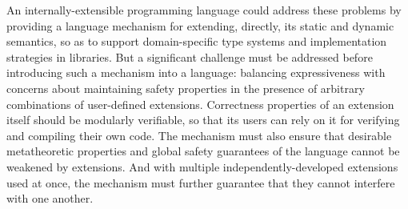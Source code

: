 
%
%



An internally-extensible programming language could address these problems by providing a language mechanism for extending, directly, its static and dynamic semantics, so as to support domain-specific type systems and implementation strategies in libraries. 
But a significant challenge must be addressed before introducing such a mechanism into a language: balancing  expressiveness with concerns about maintaining safety properties in the presence of arbitrary combinations of user-defined  extensions.  Correctness properties of an extension itself should be modularly verifiable, so that its users can rely on it for verifying and compiling their own code. The mechanism must also ensure that desirable metatheoretic properties and global safety guarantees of the language cannot be weakened by extensions. And with multiple independently-developed extensions used at once, the mechanism must further guarantee that they cannot interfere with one another. 

